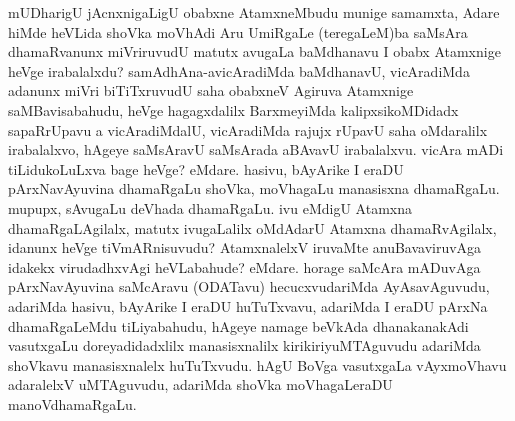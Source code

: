 
\begin{artha}
mUDharigU jAcnxnigaLigU obabxne AtamxneMbudu munige samamxta, Adare hiMde heVLida shoVka moVhAdi Aru UmiRgaLe (teregaLeM)ba saMsAra dhamaRvanunx miVriruvudU matutx avugaLa baMdhanavu I obabx Atamxnige heVge irabalalxdu? samAdhAna-avicAradiMda baMdhanavU, vicAradiMda adanunx miVri biTiTxruvudU saha obabxneV Agiruva Atamxnige saMBavisabahudu, heVge hagagxdalilx BarxmeyiMda kalipxsikoMDidadx sapaRrUpavu a vicAradiMdalU, vicAradiMda rajujx rUpavU saha oMdaralilx irabalalxvo, hAgeye saMsAravU saMsArada aBAvavU irabalalxvu. vicAra mADi tiLidukoLuLxva bage heVge? eMdare. hasivu, bAyArike I eraDU pArxNavAyuvina dhamaRgaLu shoVka, moVhagaLu manasisxna dhamaRgaLu. mupupx, sAvugaLu deVhada dhamaRgaLu. ivu eMdigU Atamxna dhamaRgaLAgilalx, matutx ivugaLalilx oMdAdarU Atamxna dhamaRvAgilalx, idanunx heVge tiVmARnisuvudu? AtamxnalelxV iruvaMte anuBavaviruvAga idakekx virudadhxvAgi heVLabahude? eMdare. horage saMcAra mADuvAga pArxNavAyuvina saMcAravu (ODATavu) hecucxvudariMda AyAsavAguvudu, adariMda hasivu, bAyArike I eraDU huTuTxvavu, adariMda I eraDU pArxNa dhamaRgaLeMdu tiLiyabahudu, hAgeye namage beVkAda dhanakanakAdi vasutxgaLu doreyadidadxlilx manasisxnalilx kirikiriyuMTAguvudu adariMda shoVkavu manasisxnalelx huTuTxvudu. hAgU BoVga vasutxgaLa vAyxmoVhavu adaralelxV uMTAguvudu, adariMda shoVka moVhagaLeraDU manoVdhamaRgaLu.
\end{artha}

